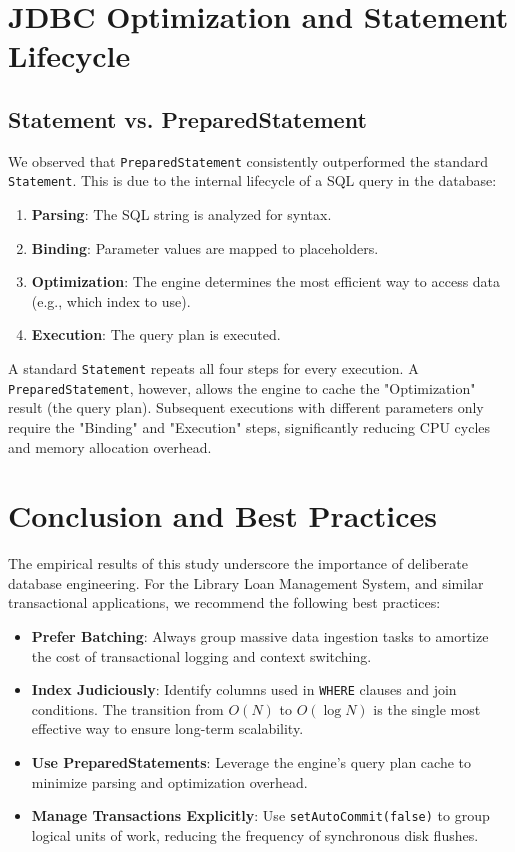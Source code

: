 \documentclass[journal]{IEEEtran}
\begin{document}
\section{JDBC Optimization and Statement Lifecycle}

\subsection{Statement vs. PreparedStatement}
We observed that \texttt{PreparedStatement} consistently outperformed the standard \texttt{Statement}. This is due to the internal lifecycle of a SQL query in the database:
\begin{enumerate}
    \item \textbf{Parsing}: The SQL string is analyzed for syntax.
    \item \textbf{Binding}: Parameter values are mapped to placeholders.
    \item \textbf{Optimization}: The engine determines the most efficient way to access data (e.g., which index to use).
    \item \textbf{Execution}: The query plan is executed.
\end{enumerate}

A standard \texttt{Statement} repeats all four steps for every execution. A \texttt{PreparedStatement}, however, allows the engine to cache the "Optimization" result (the query plan). Subsequent executions with different parameters only require the "Binding" and "Execution" steps, significantly reducing CPU cycles and memory allocation overhead.

\section{Conclusion and Best Practices}
The empirical results of this study underscore the importance of deliberate database engineering. For the Library Loan Management System, and similar transactional applications, we recommend the following best practices:
\begin{itemize}
    \item \textbf{Prefer Batching}: Always group massive data ingestion tasks to amortize the cost of transactional logging and context switching.
    \item \textbf{Index Judiciously}: Identify columns used in \texttt{WHERE} clauses and join conditions. The transition from $O(N)$ to $O(\log N)$ is the single most effective way to ensure long-term scalability.
    \item \textbf{Use PreparedStatements}: Leverage the engine's query plan cache to minimize parsing and optimization overhead.
    \item \textbf{Manage Transactions Explicitly}: Use \texttt{setAutoCommit(false)} to group logical units of work, reducing the frequency of synchronous disk flushes.
\end{itemize}
\end{document}
